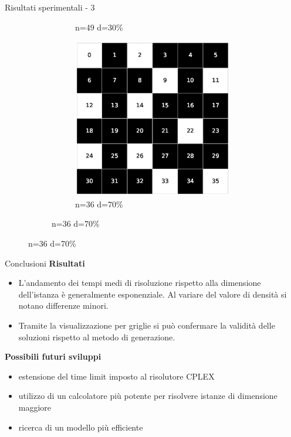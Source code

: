 \documentclass[a4paper]{beamer}
\begin{document}
\begin{frame}{Risultati sperimentali - 3}
\begin{figure}[h!]
\begin{subfigure}[b]{\textwidth}
\begin{subfigure}[b]{0.25\textwidth}
			\caption{n=49 d=30\%}
        \end{subfigure}
        \hspace{1em}
        \begin{subfigure}[b]{0.25\textwidth}
            \includegraphics[width=\columnwidth]{images/Tai36c_6x6_70.eps}
			\caption{n=36 d=70\%}
        \end{subfigure}
     \end{subfigure}
\end{figure}
\end{frame}

\begin{frame}{Conclusioni}
\textbf{Risultati}\\
\begin{itemize}
\item L'andamento dei tempi medi di risoluzione rispetto alla dimensione dell'istanza è generalmente esponenziale. \newline Al variare del valore di densità si notano differenze minori.
\item Tramite la visualizzazione per griglie si può confermare la validità delle soluzioni rispetto al metodo di generazione.
\end{itemize}
\vfill
\textbf{Possibili futuri sviluppi}\\
\begin{itemize}
\item estensione del time limit imposto al risolutore CPLEX 
\item utilizzo di un calcolatore più potente per risolvere istanze di dimensione maggiore
\item ricerca di un modello più efficiente
\end{itemize}
\end{frame}
\end{document}
